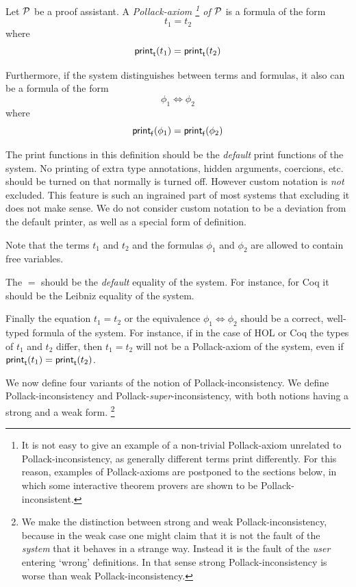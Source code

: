 \documentclass{entcs}
\begin{document}
\begin{definition}
Let ${\cal P}$ be a proof assistant.
A \emph{Pollack-axiom%
\footnote{It is not
easy to give an example of a non-trivial Pollack-axiom unrelated to
Pollack-inconsistency,
as generally different terms print differently.
For this reason, examples of Pollack-axioms are postponed to the sections below,
in which some interactive theorem provers are shown to be Pollack-inconsistent.}
of ${\cal P}$}
is a formula of the form
$$t_1 = t_2$$
where
$${\sf print}_{\sf t}(t_1) = {\sf print}_{\sf t}(t_2)$$

\noindent
Furthermore, if the system distinguishes between terms and formulas, it also can be
a formula of the form
$$\phi_1 \Leftrightarrow \phi_2$$
where
$${\sf print}_{\sf f}(\phi_1) = {\sf print}_{\sf f}(\phi_2)$$

\noindent
The {\sf print} functions in this definition should be the \emph{default} {\sf print} functions
of the system.
No printing of extra type annotations, hidden arguments, coercions, etc. should be turned on
that normally is turned off.
However custom notation is \emph{not} excluded.
This feature is such an ingrained part of most systems
that excluding it does not make sense.
We do not consider custom notation to be a deviation from the
default printer, as well as a special form of definition.

Note that the terms $t_1$ and $t_2$ and the formulas $\phi_1$ and $\phi_2$ are allowed to contain free variables.

The $=$ should be the \emph{default} equality of the system.
For instance, for Coq it should be the Leibniz equality of the system.

Finally the equation $t_1 = t_2$ or the equivalence $\phi_1 \Leftrightarrow \phi_2$
should be a correct, well-typed formula of the system.
For instance, if in the case of {\small HOL} or  Coq the types of $t_1$ and $t_2$ differ,
then $t_1 = t_2$ will not be a Pollack-axiom of the system, even
if ${\sf print}_{\sf t}(t_1) = {\sf print}_{\sf t}(t_2)$.

\end{definition}

\noindent
We now define four variants of the notion of Pollack-inconsistency.
We define Pollack-inconsistency and Pollack-\emph{super}-inconsistency,
with both notions having a strong and a weak form.%
\footnote{%
We make the distinction between strong and weak Pollack-inconsistency,
because in the weak case one might claim that it is not the fault of
the \emph{system} that it behaves in a strange way.
Instead it is
the fault of the \emph{user} entering `wrong' definitions.
In that sense strong Pollack-inconsistency is worse
than weak Pollack-inconsistency.
}
\end{document}
